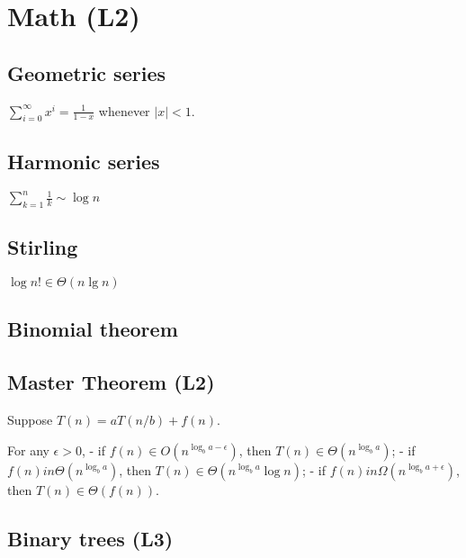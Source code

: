 \documentclass[
]{article}
\date{}
\begin{document}
\hypertarget{math-l2}{%
\section{Math (L2)}\label{math-l2}}

\hypertarget{geometric-series}{%
\subsection{Geometric series}\label{geometric-series}}

\(\sum_{i=0}^\infty x^i = \frac{1}{1-x}\) whenever \(|x|<1\).

\hypertarget{harmonic-series}{%
\subsection{Harmonic series}\label{harmonic-series}}

\(\sum_{k=1}^{n}\frac{1}{k} \sim \log n\)

\hypertarget{stirling}{%
\subsection{Stirling}\label{stirling}}

\(\log n! \in \Theta(n\lg n)\)

\hypertarget{binomial-theorem}{%
\subsection{Binomial theorem}\label{binomial-theorem}}

\hypertarget{master-theorem-l2}{%
\subsection{Master Theorem (L2)}\label{master-theorem-l2}}

Suppose \(T(n) = aT(n/b) + f(n)\).

For any \(\epsilon > 0\), - if \(f(n) \in O(n^{\log_b a - \epsilon})\),
then \(T(n) \in \Theta(n^{\log_b a})\); - if
\(f(n) in \Theta(n^{\log_b a})\), then
\(T(n) \in \Theta(n^{\log_b a} \log n)\); - if
\(f(n) in \Omega(n^{\log_b a + \epsilon})\), then
\(T(n) \in \Theta(f(n))\).

\hypertarget{binary-trees-l3}{%
\subsection{Binary trees (L3)}\label{binary-trees-l3}}
\end{document}
